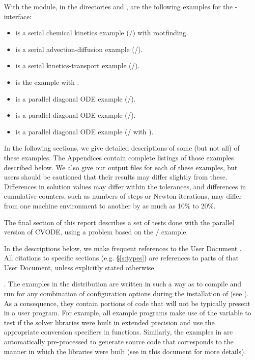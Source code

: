 With the {\fcvode} module, in the directories 
 and
, are the following examples for
the {\F}-{\C} interface:
\begin{itemize}
\item {} is a serial chemical kinetics example (/{\dense})
       with rootfinding.
\item {} is a serial advection-diffusion example (/{\band}).
\item {} is a serial kinetics-transport example (/{\spgmr}).
\item {} is the  example with {\fcvbp}.
\item {} is a parallel diagonal ODE example
       (/).
\item {} is a parallel diagonal ODE example (/{\spgmr}).
\item {} is a parallel diagonal ODE example (/{\spgmr} with 
  {\fcvbbd}).
\end{itemize}

\vspace{0.2in}\noindent
In the following sections, we give detailed descriptions of some (but
not all) of these examples.  The Appendices contain complete listings
of those examples described below.  We also give our output files for
each of these examples, but users should be cautioned that their
results may differ slightly from these.  Differences in solution
values may differ within the tolerances, and differences in cumulative
counters, such as numbers of steps or Newton iterations, may differ
from one machine environment to another by as much as 10\% to 20\%.

The final section of this report describes a set of tests done with the
parallel version of CVODE, using a problem based on the /
example.

In the descriptions below, we make frequent references to the {\cvode}
User Document \cite{cvode2.2.0_ug}.  All citations to specific sections
(e.g. \S\ref{s:types}) are references to parts of that User Document, unless
explicitly stated otherwise.

\vspace{0.2in}.
The examples in the {\cvode} distribution are written in such a way as
to compile and run for any combination of configuration options during
the installation of {\sundials} (see ). As a consequence,
they contain portions of code that will not be typically present in a
user program. For example, all {\C} example programs make use of the
variable  to test if the solver libraries
were built in extended precision and use the appropriate conversion 
specifiers in  functions. Similarly, the {\F} examples in
{\fcvode} are automatically pre-processed to generate source code that
corresponds to the manner in which the {\cvode} libraries were built
(see  in this document for more details).
